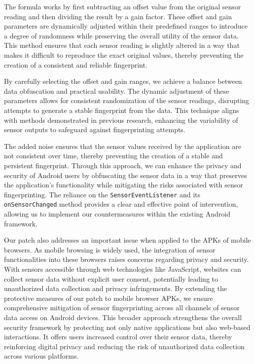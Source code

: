 \documentclass[11pt,
  oneside,openany,    %
]{scrreprt}
\begin{document}
The formula works by first subtracting an offset value from the original sensor reading and then dividing the result by a gain factor.
These offset and gain parameters are dynamically adjusted within their predefined ranges to introduce a degree of randomness while preserving the overall utility of the sensor data.
This method ensures that each sensor reading is slightly altered in a way that makes it difficult to reproduce the exact original values, thereby preventing the creation of a consistent and reliable fingerprint.

By carefully selecting the offset and gain ranges, we achieve a balance between data obfuscation and practical usability.
The dynamic adjustment of these parameters allows for consistent randomization of the sensor readings, disrupting attempts to generate a stable fingerprint from the data.
This technique aligns with methods demonstrated in previous research, enhancing the variability of sensor outputs to safeguard against fingerprinting attempts.

The added noise ensures that the sensor values received by the application are not consistent over time, thereby preventing the creation of a stable and persistent fingerprint.
Through this approach, we can enhance the privacy and security of Android users by obfuscating the sensor data in a way that preserves the application's functionality while mitigating the risks associated with sensor fingerprinting.
The reliance on the \verb|SensorEventListener| and its \verb|onSensorChanged| method provides a clear and effective point of intervention, allowing us to implement our countermeasures within the existing Android framework.

Our patch also addresses an important issue when applied to the APKs of mobile browsers.
As mobile browsing is widely used, the integration of sensor functionalities into these browsers raises concerns regarding privacy and security.
With sensors accessible through web technologies like JavaScript, websites can collect sensor data without explicit user consent, potentially leading to unauthorized data collection and privacy infringements.
By extending the protective measures of our patch to mobile browser APKs, we ensure comprehensive mitigation of sensor fingerprinting across all channels of sensor data access on Android devices.
This broader approach strengthens the overall security framework by protecting not only native applications but also web-based interactions.
It offers users increased control over their sensor data, thereby reinforcing digital privacy and reducing the risk of unauthorized data collection across various platforms.
\end{document}
